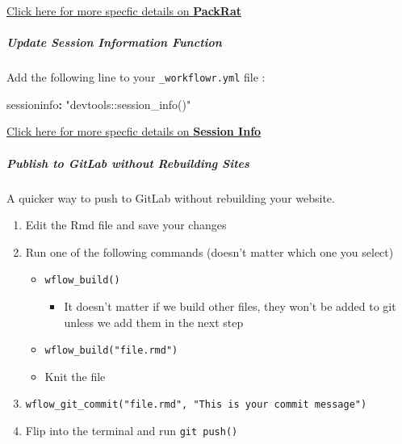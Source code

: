 \documentclass[openany]{article}
\newenvironment{Shaded}{\begin{snugshade}}{\end{snugshade}}
\newcommand{\NormalTok}[1]{#1}
\newcommand{\OperatorTok}[1]{\textcolor[rgb]{0.81,0.36,0.00}{\textbf{#1}}}
\newcommand{\StringTok}[1]{\textcolor[rgb]{0.31,0.60,0.02}{#1}}
\providecommand{\tightlist}{%
  \setlength{\itemsep}{0pt}\setlength{\parskip}{0pt}}
\let\oldsubparagraph\subparagraph
\renewcommand{\subparagraph}[1]{\oldsubparagraph{#1}\mbox{}}
\begin{document}
\protect\hyperlink{adding-packrat-1}{Click here for more specfic details on \textbf{PackRat}}

\hypertarget{update-session-information-function}{%
\subparagraph{Update Session Information Function}\label{update-session-information-function}}

Add the following line to your \texttt{\_workflowr.yml} file :

\begin{Shaded}
\begin{Highlighting}[]
\NormalTok{sessioninfo}\OperatorTok{:}\StringTok{ "devtools::session_info()"}
\end{Highlighting}
\end{Shaded}

\protect\hyperlink{update-session-information-function-1}{Click here for more specfic details on \textbf{Session Info}}

\hypertarget{publish-to-gitlab-without-rebuilding-sites}{%
\subparagraph{Publish to GitLab without Rebuilding Sites}\label{publish-to-gitlab-without-rebuilding-sites}}

A quicker way to push to GitLab without rebuilding your website.

\begin{enumerate}
\def\labelenumi{\arabic{enumi}.}
\tightlist
\item
  Edit the Rmd file and save your changes
\item
  Run one of the following commands (doesn't matter which one you select)

  \begin{itemize}
  \tightlist
  \item
    \texttt{wflow\_build()}

    \begin{itemize}
    \tightlist
    \item
      It doesn't matter if we build other files, they won't be added to git unless we add them in the next step
    \end{itemize}
  \item
    \texttt{wflow\_build("file.rmd")}
  \item
    Knit the file
  \end{itemize}
\item
  \texttt{wflow\_git\_commit("file.rmd",\ "This\ is\ your\ commit\ message")}
\item
  Flip into the terminal and run \texttt{git\ push()}
\end{enumerate}
\end{document}
